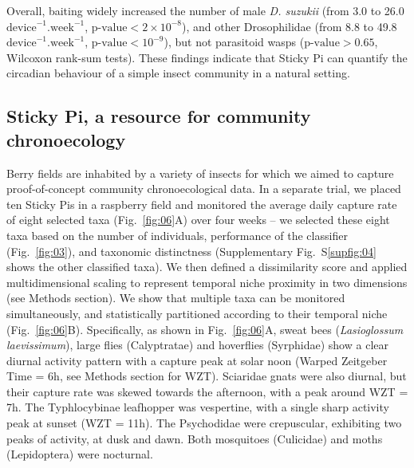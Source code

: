 \documentclass[12pt]{article}
\begin{document}
\begin{linenumbers}
		Overall, baiting widely increased the number of male \emph{D. suzukii} (from 3.0 to 26.0 $\text{device}^{-1}.\text{week}^{-1}$, $\text{p-value} < 2\times{}10^{-8}$), and other Drosophilidae (from 8.8 to 49.8 $\text{device}^{-1}.\text{week}^{-1}$, $\text{p-value} < 10^{-9}$), but not parasitoid wasps ($\text{p-value} > 0.65$, Wilcoxon rank-sum tests).
		These findings indicate that Sticky Pi can quantify the circadian behaviour of a simple insect community in a natural setting.

		\subsection*{Sticky Pi, a resource for community chronoecology}

		Berry fields are inhabited by a variety of insects for which we aimed to capture proof-of-concept community chronoecological data. In a separate trial, we placed ten Sticky Pis in a raspberry field and monitored the average daily capture rate of eight selected taxa (Fig.~\ref{fig:06}A) over four weeks – we selected these eight taxa based on the number of individuals, performance of the classifier (Fig.~\ref{fig:03}), and taxonomic distinctness (Supplementary Fig.~S\ref{supfig:04} shows the other classified taxa). We then defined a dissimilarity score and applied multidimensional scaling to represent temporal niche proximity in two dimensions (see Methods section). We show that multiple taxa can be monitored simultaneously, and statistically partitioned according to their temporal niche (Fig.~\ref{fig:06}B). Specifically, as shown in Fig.~\ref{fig:06}A, sweat bees (\emph{Lasioglossum laevissimum}), large flies (Calyptratae) and hoverflies (Syrphidae) show a clear diurnal activity pattern with a capture peak at solar noon (Warped Zeitgeber Time = 6h, see Methods section for WZT). Sciaridae gnats were also diurnal, but their capture rate was skewed towards the afternoon, with a peak around WZT = 7h. The Typhlocybinae leafhopper was vespertine, with a single sharp activity peak at sunset (WZT = 11h). The Psychodidae were crepuscular, exhibiting two peaks of activity, at dusk and dawn. Both mosquitoes (Culicidae) and moths (Lepidoptera) were nocturnal. 		


\end{linenumbers}
\end{document}

